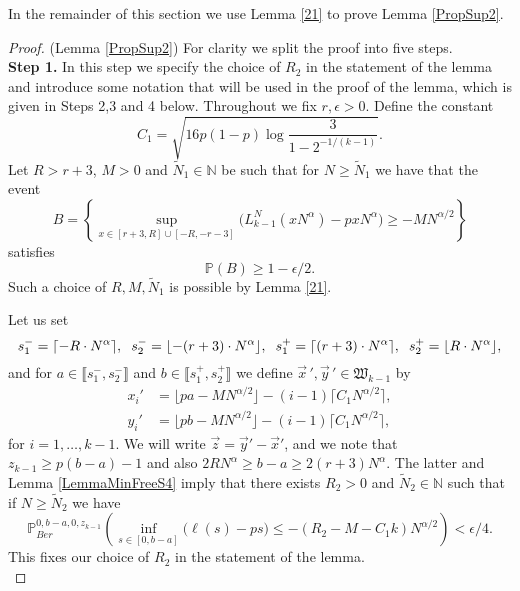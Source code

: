 In the remainder of this section we use Lemma \ref{21} to prove Lemma \ref{PropSup2}.
\begin{proof} (Lemma \ref{PropSup2}) For clarity we split the proof into five steps.\\ 
	
	\noindent\textbf{Step 1.} In this step we specify the choice of $R_2$ in the statement of the lemma and introduce some notation that will be used in the proof of the lemma, which is given in Steps 2,3 and 4 below. Throughout we fix $r, \epsilon > 0$. Define the constant
	\begin{equation}\label{4.3Cdef}
		C_1 = \sqrt{16p(1-p)\log\frac{3}{1-2^{-1/(k-1)}}}.
	\end{equation}
	Let $R > r + 3$, $M > 0$ and $\tilde{N}_1 \in \mathbb{N}$ be such that for $N \geq \tilde{N}_1$ we have that the event
	\begin{equation}\label{S5EventB}
		B = \left\{ \sup_{x\in [r+3, R] \cup [-R,-r-3]} \big(L^N_{k-1}(xN^\alpha) - pxN^\alpha\big) \geq -MN^{\alpha/2} \right\}
	\end{equation}
	satisfies 
	\begin{equation}\label{S5EventBineq}
		\mathbb{P} \left( B\right) \geq 1 - \epsilon/2.
	\end{equation}
	Such a choice of $R, M, \tilde{N}_1$ is possible by Lemma \ref{21}.
	
	Let us set 
	$$s^-_1 = \lceil - R \cdot N^{\alpha} \rceil, \hspace{2mm} s^-_2 =  \lfloor -(r+3) \cdot N^{\alpha} \rfloor, \hspace{2mm} s^+_1 = \lceil (r+3) \cdot N^{\alpha} \rceil, \hspace{2mm} s^+_2 =  \lfloor R \cdot N^{\alpha} \rfloor,$$
	and for $a \in \llbracket s_1^-, s_2^- \rrbracket$ and $b \in \llbracket s_1^+, s_2^+ \rrbracket$ we define $\vec{x}\,',\vec{y}\,' \in \mathfrak{W}_{k-1}$ by
	\begin{equation}\label{S5Boundary}
		\begin{split}
			x_i' &= \lfloor pa - MN^{\alpha/2}\rfloor - (i-1)\lceil C_1N^{\alpha/2}\rceil,\\
			y_i' &= \lfloor pb - MN^{\alpha/2}\rfloor - (i-1)\lceil C_1N^{\alpha/2}\rceil,
		\end{split}
	\end{equation}  
	for $i = 1, \dots, k-1$. We will write $\vec{z} = \vec{y}' - \vec{x}'$, and we note that $z_{k-1} \geq p (b-a) -1$ and also $2RN^{\alpha} \geq b-a \geq 2(r+3) N^{\alpha}$. The latter and Lemma \ref{LemmaMinFreeS4} imply that there exists $R_2 > 0$ and $\tilde{N}_2 \in \mathbb{N}$ such that if $N \geq \tilde{N}_2$ we have
	\begin{equation}\label{S5DefR2}
		\mathbb{P}^{0, b - a, 0, z_{k-1}}_{Ber} \left( \inf_{s\in[0,b-a]} \big(\ell(s) - ps\big) \leq -(R_2 - M - C_1k) N^{\alpha/2} \right) < \epsilon/4.
	\end{equation}
	This fixes our choice of $R_2$ in the statement of the lemma. \\
	

\end{proof}
